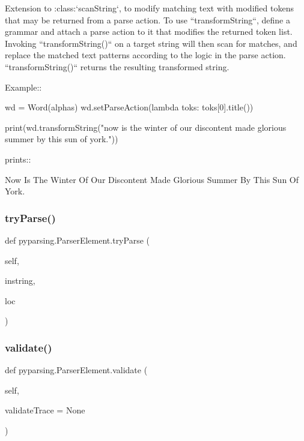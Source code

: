 \begin{DoxyVerb}Extension to :class:`scanString`, to modify matching text with modified tokens that may
be returned from a parse action.  To use ``transformString``, define a grammar and
attach a parse action to it that modifies the returned token list.
Invoking ``transformString()`` on a target string will then scan for matches,
and replace the matched text patterns according to the logic in the parse
action.  ``transformString()`` returns the resulting transformed string.

Example::

    wd = Word(alphas)
    wd.setParseAction(lambda toks: toks[0].title())

    print(wd.transformString("now is the winter of our discontent made glorious summer by this sun of york."))

prints::

    Now Is The Winter Of Our Discontent Made Glorious Summer By This Sun Of York.
\end{DoxyVerb}
 \mbox{\label{classpyparsing_1_1ParserElement_a0f4f5dac320faf316bd8a54022f4345e}} 
\subsubsection{\texorpdfstring{try\+Parse()}{tryParse()}}
{\footnotesize\ttfamily def pyparsing.\+Parser\+Element.\+try\+Parse (\begin{DoxyParamCaption}\item[{}]{self,  }\item[{}]{instring,  }\item[{}]{loc }\end{DoxyParamCaption})}

\mbox{\label{classpyparsing_1_1ParserElement_ab3aa74c2cd7880b45b594e8cfea22a07}} 
\subsubsection{\texorpdfstring{validate()}{validate()}}
{\footnotesize\ttfamily def pyparsing.\+Parser\+Element.\+validate (\begin{DoxyParamCaption}\item[{}]{self,  }\item[{}]{validate\+Trace = {\ttfamily None} }\end{DoxyParamCaption})}

